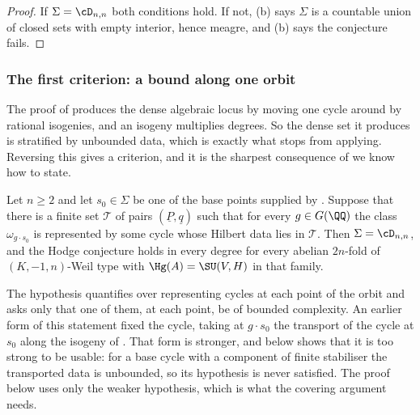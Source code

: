 \begin{proof}
If $\Sigma=\cD_{n,n}$ both conditions hold. If not, (b)
says $\Sigma$ is a countable union of closed sets with empty interior, hence
meagre, and (b) says the conjecture fails.
\end{proof}

\subsubsection*{The first criterion: a bound along one orbit}

The proof of  produces the dense algebraic locus by moving
one cycle around by rational isogenies, and an isogeny multiplies degrees. So
the dense set it produces is stratified by unbounded data, which is exactly
what stops  from applying. Reversing this gives a
criterion, and it is the sharpest consequence of  we
know how to state.

\begin{theorem}\label{thm:degreebound}
Let $n\ge2$ and let $s_{0}\in\Sigma$ be one of the base points supplied by
. Suppose that there is a finite set $\mathcal{T}$ of pairs
$(\underline{P},\underline{q})$ such that for every $g\in G(\QQ)$ the class
$\omega_{g\cdot s_{0}}$ is represented by some cycle whose Hilbert data lies
in $\mathcal{T}$. Then $\Sigma=\cD_{n,n}$, and the Hodge conjecture holds in every
degree for every abelian $2n$-fold of $(K,-1,n)$-Weil type with
$\Hg(A)=\SU(V,H)$ in that family.
\end{theorem}

\begin{remark}\label{rem:chosencycle}
The hypothesis quantifies over representing cycles at each point of the orbit
and asks only that one of them, at each point, be of bounded complexity. An
earlier form of this statement fixed the cycle, taking at $g\cdot s_{0}$ the
transport of the cycle at $s_{0}$ along the isogeny of
. That form is stronger, and  below
shows that it is too strong to be usable: for a base cycle with a component of
finite stabiliser the transported data is unbounded, so its hypothesis is never
satisfied. The proof below uses only the weaker hypothesis, which is what the
covering argument needs.
\end{remark}

